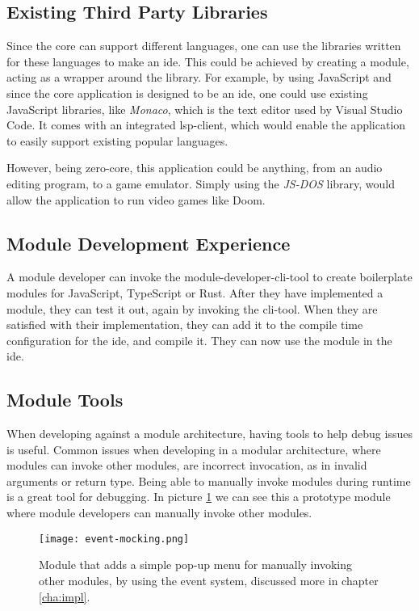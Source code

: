 \subsection{Existing Third Party Libraries}

Since the core can support different languages, one can use the libraries
written for these languages to make an \gls*{ide}. This could be achieved by
creating a module, acting as a wrapper around the library. For example, by
using JavaScript and since the core application is designed to be an \gls*{ide},
one could use existing JavaScript libraries, like \textit{Monaco}, which is the
text editor used by Visual Studio Code. It comes with an integrated
\gls*{lsp}-client, which would enable the application to easily support existing
popular languages.

However, being zero-core, this application could be anything, from an audio
editing program, to a game emulator. Simply using the \textit{JS-DOS} library,
would allow the application to run video games like Doom.

\subsection{Module Development Experience}

A module developer can invoke the module-developer-\gls*{cli}-tool to create
boilerplate modules for JavaScript, TypeScript or Rust. After they have
implemented a module, they can test it out, again by invoking the
\gls*{cli}-tool. When they are satisfied with their implementation, they can add
it to the compile time configuration for the \gls*{ide}, and compile it. They
can now use the module in the \gls*{ide}.

\subsection{Module Tools}

When developing against a module architecture, having tools to help debug issues
is useful. Common issues when developing in a modular architecture, where
modules can invoke other modules, are incorrect invocation, as in invalid
arguments or return type. Being able to manually invoke modules during runtime
is a great tool for debugging. In picture \ref{pic:eventMock} we can see this a
prototype module where module developers can manually invoke other modules.

\begin{figure}[H]
  \centering
  \texttt{[image: event-mocking.png]}
  \caption{
    Module that adds a simple pop-up menu for manually invoking other modules,
    by using the event system, discussed more in chapter \ref{cha:impl}.
  }
  \label{pic:eventMock}
\end{figure}

